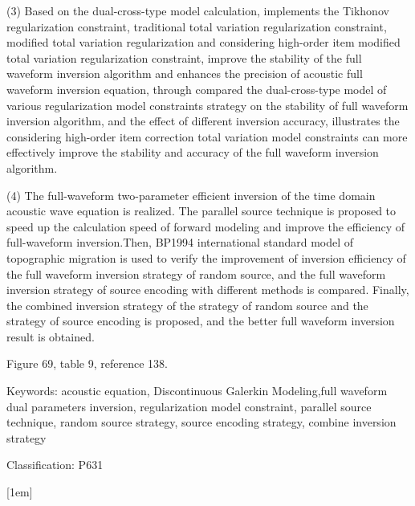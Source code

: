 \documentclass[12pt]{article}
\begin{document}
\par
(3) Based on the dual-cross-type model calculation, implements the Tikhonov regularization constraint, traditional total variation regularization constraint, modified total variation regularization and considering high-order item modified total variation regularization constraint, improve the stability of the full waveform inversion algorithm and enhances the precision of acoustic full waveform inversion equation, through compared the dual-cross-type model of various regularization model constraints strategy on the stability  of full waveform inversion algorithm, and the effect of different inversion accuracy, illustrates the considering high-order item correction total variation model constraints can more effectively improve the stability and accuracy of the full waveform inversion algorithm.
\par
(4) The full-waveform two-parameter efficient inversion of the time domain acoustic wave equation is realized. The parallel source technique is proposed to speed up the calculation speed of forward modeling and improve the efficiency of full-waveform inversion.Then, BP1994 international standard model of topographic migration is used to verify the improvement of inversion efficiency of the full waveform inversion strategy of random source, and the full waveform inversion strategy of source encoding with different methods is compared. Finally, the combined inversion strategy of the strategy of random source and the strategy of source encoding is proposed, and the better full waveform inversion result is obtained.
\par
Figure 69, table 9, reference 138. 
\par
\noindent
Keywords: acoustic equation, Discontinuous Galerkin Modeling,full waveform dual parameters inversion, regularization model constraint, parallel source technique, random source strategy, source encoding strategy, combine inversion strategy
\par
\noindent
Classification: P631

\newpage
\tableofcontents
{}
              [1em]
              {}%
              {\contentslabel{1.5em}}%
              {}%
              {\titlerule*[1pc]{$\cdot$}\contentspage}%
\newpage

\setcounter{page}{1}
\fancyhf{}
\pagestyle{fancy}
\renewcommand{\sectionmark}[1]{\markright{#1}}\renewcommand{\subsectionmark}[1]{}
\rhead{\fancyplain{}{\rightmark}} 
\cfoot{\fancyplain{}{\thepage}}
\end{document}
